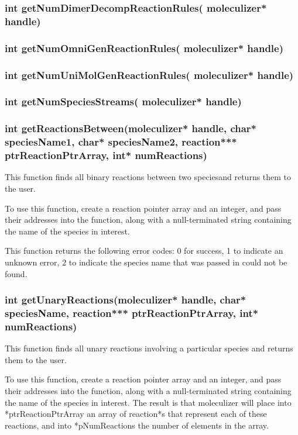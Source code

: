 \subsubsection{int getNumDimerDecompReactionRules( moleculizer* handle)}

\subsubsection{int getNumOmniGenReactionRules( moleculizer* handle)}

\subsubsection{int getNumUniMolGenReactionRules( moleculizer* handle)}

\subsubsection{int getNumSpeciesStreams( moleculizer* handle)}

\subsubsection{int getReactionsBetween(moleculizer* handle, char*
  speciesName1, char* speciesName2, reaction*** ptrReactionPtrArray,
  int* numReactions)}

This function finds all binary reactions between two speciesand returns them to the user.

To use this function, create a reaction pointer array and an integer,
and pass their addresses into the function, along with a
null-terminated string containing the name of the species in
interest.  

This function returns the following error codes: 0 for success, 1 to
indicate an unknown error, 2 to indicate the species name that was
passed in could not be found.

\subsubsection{int getUnaryReactions(moleculizer* handle, char*
  speciesName, reaction*** ptrReactionPtrArray, int* numReactions)}

This function finds all unary reactions involving a particular
species and returns them to the user.

To use this function, create a reaction pointer array and an integer,
and pass their addresses into the function, along with a
null-terminated string containing the name of the species in
interest.  The result is that moleculizer will place into
*ptrReactionPtrArray an array of reaction*s that represent each of
these reactions, and into *pNumReactions the number of elements in the array.

